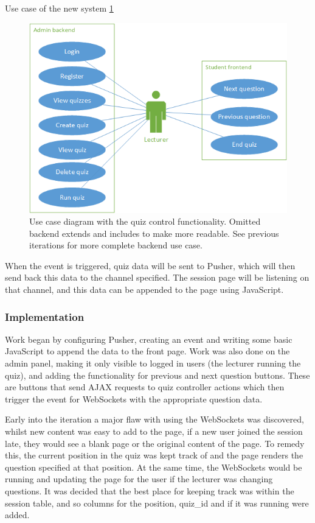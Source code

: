 Use case of the new system \ref{fig:iter-4-use-case}
\begin{figure}
	\caption{Use case diagram with the quiz control functionality. Omitted backend extends and includes to make more readable. See previous iterations for more complete backend use case.}
	\centerline{\includegraphics{Chapter2/Iter-4/iter-4-use-case}}
	\label{fig:iter-4-use-case}
\end{figure}

When the event is triggered, quiz data will be sent to Pusher, which will then send back this data to the channel specified. The session page will be listening on that channel, and this data can be appended to the page using JavaScript.

\subsubsection{Implementation}
Work began by configuring Pusher, creating an event and writing some basic JavaScript to append the data to the front page. Work was also done on the admin panel, making it only visible to logged in users (the lecturer running the quiz), and adding the functionality for previous and next question buttons. These are buttons that send AJAX requests to quiz controller actions which then trigger the event for WebSockets with the appropriate question data.

Early into the iteration a major flaw with using the WebSockets was discovered, whilst new content was easy to add to the page, if a new user joined the session late, they would see a blank page or the original content of the page. To remedy this, the current position in the quiz was kept track of and the page renders the question specified at that position. At the same time, the WebSockets would be running and updating the page for the user if the lecturer was changing questions. It was decided that the best place for keeping track was within the session table, and so columns for the position, quiz\_id and if it was running were added.


